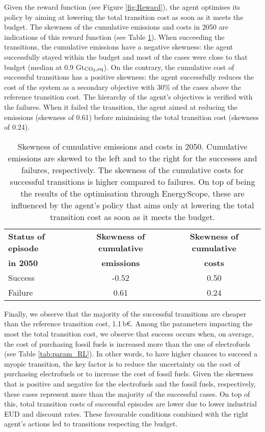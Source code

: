 \newpage
Given the reward function (see Figure \ref{fig:Reward}), the agent optimises its policy by aiming at lowering the total transition cost as soon as it meets the  budget. The skewness of the cumulative emissions and costs in 2050 are indications of this reward function (see Table \ref{tab:skewness_gwp_cost}). When succeeding the transitions, the cumulative emissions have a negative skewness: the agent successfully stayed within the budget and most of the cases were close to that budget (median at 0.9 Gt$_{\ce{CO2},\text{eq}}$). On the contrary, the cumulative cost of successful transitions has a positive skewness: the agent successfully reduces the cost of the system as a secondary objective with 30\% of the cases above the reference transition cost. The hierarchy of the agent's objectives is verified with the failures. When it failed the transition, the agent aimed at reducing the emissions (skewness of 0.61) before minimising the total transition cost (skewness of 0.24). 

\begin{table}[htbp!]
\caption{Skewness of cumulative emissions and costs in 2050. Cumulative emissions are skewed to the left and to the right for the successes and failures, respectively. The skewness of the cumulative costs for successful transitions is higher compared to failures. On top of being the results of the optimisation through EnergyScope, these are influenced by the agent's policy that aims only at lowering the total transition cost as soon as it meets the  budget.}
\label{tab:skewness_gwp_cost}
\centering
\begin{tabular}{l c c}
\toprule
\textbf{Status of episode}  & \textbf{Skewness of cumulative} & \textbf{Skewness of cumulative} \\
\textbf{in 2050}  & \textbf{emissions} & \textbf{costs} \\	
\midrule
Success & -0.52 & 0.50 \\
Failure & 0.61 & 0.24 \\
\bottomrule							

\end{tabular}
\end{table}

\newpage
Finally, we observe that the majority of the successful transitions are cheaper than the reference transition cost, 1.1\,b€. Among the parameters impacting the most the total transition cost, we observe that success occurs when, on average,  the cost of purchasing fossil fuels is increased more than the one of electrofuels (see Table \ref{tab:param_RL}). In other words, to have higher chances to succeed a myopic transition, the key factor is to reduce the uncertainty on the cost of purchasing electrofuels or to increase the cost of fossil fuels. Given the skewness that is positive and negative for the electrofuels and the fossil fuels, respectively, these cases represent more than the majority of the successful cases. On top of this, total transition costs of successful episodes are lower due to lower industrial \gls{EUD} and discount rates. These favourable conditions combined with the right agent's actions led to transitions respecting the  budget.

